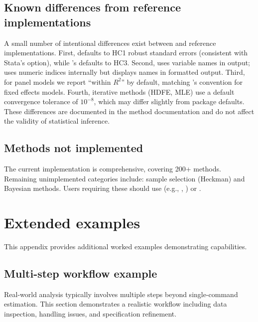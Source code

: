 \subsection{Known differences from reference implementations}
\label{app:known-differences}

A small number of intentional differences exist between 
and reference implementations. First,  defaults to
HC1 robust standard errors (consistent with Stata's  option),
while 's  defaults to HC3. Second, 
uses variable names in output;  uses numeric indices
internally but displays names in formatted output. Third, for panel models
we report ``within $R^2$'' by default, matching 's convention for
fixed effects models. Fourth, iterative methods (HDFE, MLE) use a default
convergence tolerance of $10^{-8}$, which may differ slightly from
 package defaults. These differences are documented in the
method documentation and do not affect the validity of statistical inference.

\subsection{Methods not implemented}

The current implementation is comprehensive, covering 200+ methods. Remaining
unimplemented categories include: sample selection (Heckman) and Bayesian methods.
Users requiring these should use  (e.g., ,
) or .


\section{Extended examples} \label{app:extended-examples}
\setcounter{table}{0}
\setcounter{figure}{0}

This appendix provides additional worked examples demonstrating
 capabilities.

\subsection{Multi-step workflow example}

Real-world analysis typically involves multiple steps beyond single-command
estimation. This section demonstrates a realistic workflow including data
inspection, handling issues, and specification refinement.

